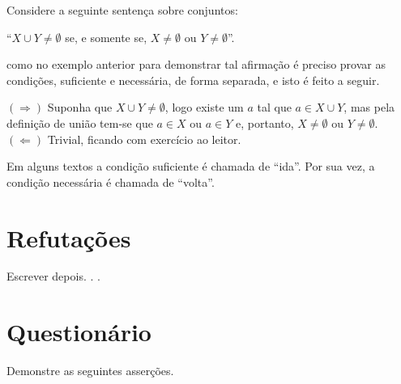 \begin{exemplo}\label{exe:ProvaIff3}
	Considere a seguinte sentença sobre conjuntos:
	\begin{center}
		``$X \cup Y \neq \emptyset$ se, e somente se, $X \neq \emptyset$ ou $Y \neq \emptyset$''.
	\end{center}
	como no exemplo anterior para demonstrar tal afirmação é preciso provar as condições, suficiente e necessária, de forma separada, e isto é feito a seguir.
\end{exemplo}

\begin{prova}
		$(\Rightarrow)$ Suponha que $X \cup Y \neq \emptyset$, logo existe um $a$ tal que $a \in X \cup Y$, mas pela definição de união tem-se que $a \in X$ ou $a \in Y$ e, portanto, $X \neq \emptyset$ ou $Y \neq \emptyset$. $(\Leftarrow)$ Trivial, ficando com exercício ao leitor.
\end{prova}

\begin{atencao}
	Em alguns textos \cite{fmcbook, benjaLivro2010} a condição suficiente é chamada de ``ida''. Por sua vez, a condição necessária é chamada de ``volta''.
\end{atencao}

\section{Refutações}

{\color{red}Escrever depois. . .}

\section{Questionário}\label{sec:Questionario2part1}

\begin{questao}\label{test:Demosntracoes1}
	Demonstre as seguintes asserções.
\end{questao}

